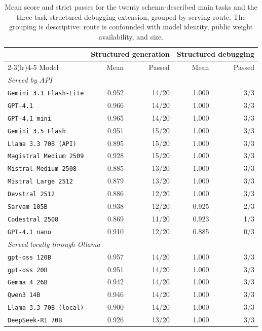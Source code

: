 \begin{table}[p]
\centering\footnotesize
\renewcommand{\arraystretch}{0.90}
\caption{Mean score and strict passes for the twenty schema-described main tasks and the
three-task structured-debugging extension, grouped by serving route. The grouping is descriptive:
route is confounded with model identity, public weight availability, and size.}
\label{tab:debug}
\begin{tabular}{lrrrr}
\toprule
& \multicolumn{2}{c}{Structured generation} & \multicolumn{2}{c}{Structured debugging} \\
\cmidrule(lr){2-3}\cmidrule(lr){4-5}
Model & Mean & Passed & Mean & Passed \\
\midrule
\multicolumn{5}{l}{\emph{Served by API}}\\
\texttt{Gemini 3.1 Flash-Lite} & 0.952 & 14/20 & 1.000 & 3/3 \\
\texttt{GPT-4.1} & 0.966 & 14/20 & 1.000 & 3/3 \\
\texttt{GPT-4.1 mini} & 0.965 & 14/20 & 1.000 & 3/3 \\
\texttt{Gemini 3.5 Flash} & 0.951 & 15/20 & 1.000 & 3/3 \\
\texttt{Llama 3.3 70B (API)} & 0.895 & 15/20 & 1.000 & 3/3 \\
\texttt{Magistral Medium 2509} & 0.928 & 15/20 & 1.000 & 3/3 \\
\texttt{Mistral Medium 2508} & 0.885 & 13/20 & 1.000 & 3/3 \\
\texttt{Mistral Large 2512} & 0.879 & 13/20 & 1.000 & 3/3 \\
\texttt{Devstral 2512} & 0.886 & 12/20 & 1.000 & 3/3 \\
\texttt{Sarvam 105B} & 0.938 & 12/20 & 0.925 & 2/3 \\
\texttt{Codestral 2508} & 0.869 & 11/20 & 0.923 & 1/3 \\
\texttt{GPT-4.1 nano} & 0.910 & 12/20 & 0.885 & 0/3 \\
\midrule
\multicolumn{5}{l}{\emph{Served locally through Ollama}}\\
\texttt{gpt-oss 120B} & 0.957 & 14/20 & 1.000 & 3/3 \\
\texttt{gpt-oss 20B} & 0.951 & 14/20 & 1.000 & 3/3 \\
\texttt{Gemma 4 26B} & 0.942 & 14/20 & 1.000 & 3/3 \\
\texttt{Qwen3 14B} & 0.946 & 14/20 & 1.000 & 3/3 \\
\texttt{Llama 3.3 70B (local)} & 0.900 & 14/20 & 1.000 & 3/3 \\
\texttt{DeepSeek-R1 70B} & 0.926 & 13/20 & 1.000 & 3/3 \\

\end{tabular}
\end{table}
